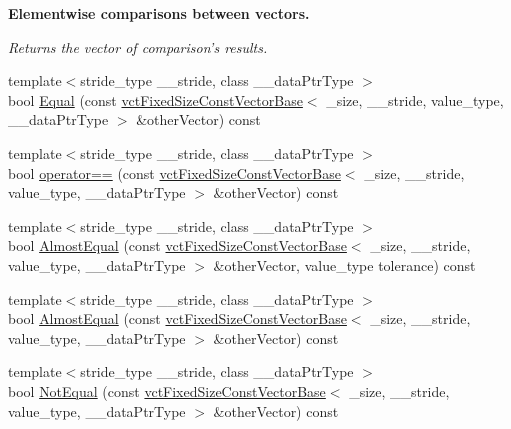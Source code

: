 \begin{Indent}{\bf Elementwise comparisons between vectors.}\par
{\em Returns the vector of comparison's results. }\begin{DoxyCompactItemize}
\item 
{\footnotesize template$<$stride\-\_\-type \-\_\-\-\_\-stride, class \-\_\-\-\_\-data\-Ptr\-Type $>$ }\\bool \hyperlink{classvct_fixed_size_const_vector_base_aa38d2e3dbaa035b37c246dc53ae9bb70}{Equal} (const \hyperlink{classvct_fixed_size_const_vector_base}{vct\-Fixed\-Size\-Const\-Vector\-Base}$<$ \-\_\-size, \-\_\-\-\_\-stride, value\-\_\-type, \-\_\-\-\_\-data\-Ptr\-Type $>$ \&other\-Vector) const 
\item 
{\footnotesize template$<$stride\-\_\-type \-\_\-\-\_\-stride, class \-\_\-\-\_\-data\-Ptr\-Type $>$ }\\bool \hyperlink{classvct_fixed_size_const_vector_base_aca59301cbeb1a7d4c4de2bc0b71ca335}{operator==} (const \hyperlink{classvct_fixed_size_const_vector_base}{vct\-Fixed\-Size\-Const\-Vector\-Base}$<$ \-\_\-size, \-\_\-\-\_\-stride, value\-\_\-type, \-\_\-\-\_\-data\-Ptr\-Type $>$ \&other\-Vector) const 
\item 
{\footnotesize template$<$stride\-\_\-type \-\_\-\-\_\-stride, class \-\_\-\-\_\-data\-Ptr\-Type $>$ }\\bool \hyperlink{classvct_fixed_size_const_vector_base_a0f25ef63a9fd997f96335a895299cba2}{Almost\-Equal} (const \hyperlink{classvct_fixed_size_const_vector_base}{vct\-Fixed\-Size\-Const\-Vector\-Base}$<$ \-\_\-size, \-\_\-\-\_\-stride, value\-\_\-type, \-\_\-\-\_\-data\-Ptr\-Type $>$ \&other\-Vector, value\-\_\-type tolerance) const 
\item 
{\footnotesize template$<$stride\-\_\-type \-\_\-\-\_\-stride, class \-\_\-\-\_\-data\-Ptr\-Type $>$ }\\bool \hyperlink{classvct_fixed_size_const_vector_base_a227427cc3efc30b79cbefac7196e21e3}{Almost\-Equal} (const \hyperlink{classvct_fixed_size_const_vector_base}{vct\-Fixed\-Size\-Const\-Vector\-Base}$<$ \-\_\-size, \-\_\-\-\_\-stride, value\-\_\-type, \-\_\-\-\_\-data\-Ptr\-Type $>$ \&other\-Vector) const 
\item 
{\footnotesize template$<$stride\-\_\-type \-\_\-\-\_\-stride, class \-\_\-\-\_\-data\-Ptr\-Type $>$ }\\bool \hyperlink{classvct_fixed_size_const_vector_base_ac918c482412a22251943dc80dc085a9a}{Not\-Equal} (const \hyperlink{classvct_fixed_size_const_vector_base}{vct\-Fixed\-Size\-Const\-Vector\-Base}$<$ \-\_\-size, \-\_\-\-\_\-stride, value\-\_\-type, \-\_\-\-\_\-data\-Ptr\-Type $>$ \&other\-Vector) const 

\end{DoxyCompactItemize}
\end{Indent}
